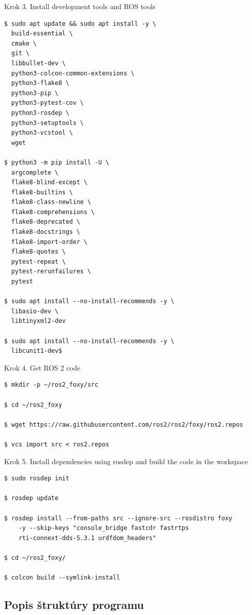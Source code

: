 \documentclass[a4paper]{feidippp}
\begin{document}
\justifying
\noindent
Krok 3. Install development tools and ROS tools
\begin{lstlisting}
$ sudo apt update && sudo apt install -y \
  build-essential \
  cmake \
  git \
  libbullet-dev \
  python3-colcon-common-extensions \
  python3-flake8 \
  python3-pip \
  python3-pytest-cov \
  python3-rosdep \
  python3-setuptools \
  python3-vcstool \
  wget

$ python3 -m pip install -U \
  argcomplete \
  flake8-blind-except \
  flake8-builtins \
  flake8-class-newline \
  flake8-comprehensions \
  flake8-deprecated \
  flake8-docstrings \
  flake8-import-order \
  flake8-quotes \
  pytest-repeat \
  pytest-rerunfailures \
  pytest

$ sudo apt install --no-install-recommends -y \
  libasio-dev \
  libtinyxml2-dev
  
$ sudo apt install --no-install-recommends -y \
  libcunit1-dev$
\end{lstlisting}
\vspace{3mm}

\justifying
\noindent
Krok 4. Get ROS 2 code
\begin{lstlisting}
$ mkdir -p ~/ros2_foxy/src

$ cd ~/ros2_foxy

$ wget https://raw.githubusercontent.com/ros2/ros2/foxy/ros2.repos

$ vcs import src < ros2.repos
\end{lstlisting}
\vspace{3mm}

\justifying
\noindent
Krok 5. Install dependencies using rosdep and build the code in the workspace
\begin{lstlisting}
$ sudo rosdep init

$ rosdep update

$ rosdep install --from-paths src --ignore-src --rosdistro foxy 
    -y --skip-keys "console_bridge fastcdr fastrtps 
    rti-connext-dds-5.3.1 urdfdom_headers"

$ cd ~/ros2_foxy/

$ colcon build --symlink-install
\end{lstlisting}
\subsection{Popis štruktúry programu}
\end{document}
